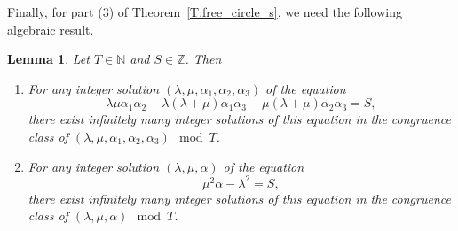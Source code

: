 \documentclass[10pt,a4paper]{amsart}
\numberwithin{equation}{section}
\newtheorem{Lemma}[Theorem]{Lemma}
\theoremstyle{definition}
\numberwithin{table}{section}
\newcommand{\N}{\mathbb{N}}
\newcommand{\Z}{\mathbb{Z}}
\begin{document}
Finally, for part (3) of Theorem~\ref{T:free_circle_s}, we need the following algebraic result.
\begin{Lemma}\label{L:number_theory}
	Let $T\in\N$ and $S\in\Z$. Then
	\begin{enumerate}\itemsep=0pt
		\item[$(1)$] For any integer solution $(\lambda,\mu,\alpha_1,\alpha_2,\alpha_3)$ of the equation
		\begin{equation}\label{EQ:la-mu}
			\lambda\mu\alpha_1\alpha_2-\lambda(\lambda+\mu)\alpha_1\alpha_3-\mu(\lambda+\mu)\alpha_2\alpha_3=S,
		\end{equation}
		there exist infinitely many integer solutions of this equation in the congruence class of $(\lambda,\mu,\alpha_1,\alpha_2,\alpha_3)\mod T$.
		\item[$(2)$] For any integer solution $(\lambda,\mu,\alpha)$ of the equation
		\begin{equation}\label{EQ:la-mu-a}
			\mu^2\alpha-\lambda^2=S,
		\end{equation}
		there exist infinitely many integer solutions of this equation in the congruence class of $(\lambda,\mu,\alpha)\mod T$.
	\end{enumerate}
\end{Lemma}
\end{document}
